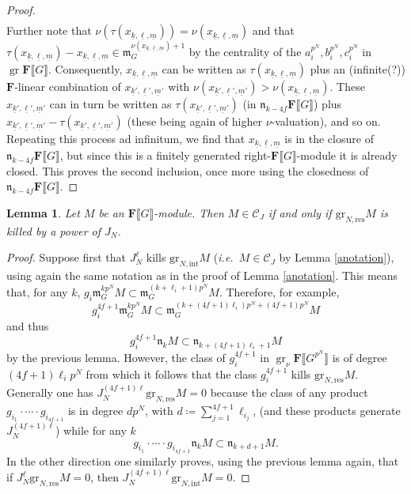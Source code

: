 \documentclass[11pt, oneside]{article}
\newcommand{\gres}{\text{gr}_{N,\text{res}}}
\newcommand{\grint}{\text{gr}_{N,\text{int}}}
\DeclareMathOperator{\gr}{gr}
\newtheorem{lemma}{Lemma}
\theoremstyle{definition}
\begin{document}
\begin{proof}
\begin{align*}
		\end{align*} Further note that $\nu(\tau(x_{\underline k,\underline\ell,\underline m}))=\nu(x_{\underline k,\underline\ell,\underline m})$ and that $\tau(x_{\underline k,\underline\ell,\underline m})-x_{\underline k,\underline\ell,\underline m}\in\mathfrak m_G^{\nu(x_{\underline k,\underline\ell,\underline m})+1}$ by the centrality of the $a_i^{p^N},b_i^{p^N},c_i^{p^N}$ in $\gr\mathbf F\llbracket G\rrbracket$. Consequently, $x_{\underline k,\underline\ell,\underline m}$ can be written as $\tau(x_{\underline k,\underline\ell,\underline m})$ plus an (infinite(?)) $\mathbf F$-linear combination of $x_{\underline k',\underline\ell',\underline m'}$ with $\nu(x_{\underline k',\underline\ell',\underline m'})>\nu(x_{\underline k,\underline\ell,\underline m})$. These $x_{\underline k',\underline\ell',\underline m'}$ can in turn be written as $\tau(x_{\underline k',\underline\ell',\underline m'})$ (in $\mathfrak n_{k-4f}\mathbf F\llbracket G\rrbracket$) plus $x_{\underline k',\underline\ell',\underline m'}-\tau(x_{\underline k',\underline\ell',\underline m'})$ (these being again of higher $\nu$-valuation), and so on.\\
		Repeating this process ad infinitum, we find that $x_{\underline k,\underline\ell,\underline m}$ is in the closure of $\mathfrak n_{k-4f}\mathbf F\llbracket G\rrbracket$, but since this is a finitely generated right-$\mathbf F\llbracket G\rrbracket$-module it is already closed. This proves the second inclusion, once more using the closedness of $\mathfrak n_{k-4f}\mathbf F\llbracket G\rrbracket$.
	\end{proof}
	\begin{lemma}\label{lastlemma}
		Let $M$ be an $\mathbf F\llbracket G\rrbracket$-module. Then $M\in\mathcal C_J$ if and only if $\gres M$ is killed by a power of $J_N$.
	\end{lemma}
	\begin{proof}
		Suppose first that $J_N^\ell$ kills $\grint M$ (\emph{i.e.~}$M\in\mathcal C_J$ by Lemma \ref{anotation}), using again the same notation as in the proof of Lemma \ref{anotation}. This means that, for any $k$, $g_i\mathfrak m_G^{kp^N}M\subset\mathfrak m_G^{(k+\ell_i+1)p^N}M$. Therefore, for example, $$g_i^{4f+1}\mathfrak m_G^{kp^N}M\subset\mathfrak m_G^{(k+(4f+1)\ell_i)p^N+(4f+1)p^N}M$$ and thus $$g_i^{4f+1}\mathfrak n_kM\subset\mathfrak n_{k+(4f+1)\ell_i+1}M$$ by the previous lemma.
		However, the class of $g_i^{4f+1}$ in $\gr_\nu\mathbf F\llbracket G^{p^N}\rrbracket$ is of degree $(4f+1)\ell_ip^N$ from which it follows that the class $g_i^{4f+1}$ kills $\gres M$. Generally one has $J_N^{(4f+1)\ell}\gres M=0$ because the class of any product $g_{i_1}\cdot\cdots\cdot g_{i_{4f+1}}$ is in degree $dp^N$, with $d\coloneqq\sum_{j=1}^{4f+1}\ell_{i_j}$, (and these products generate $J_N^{(4f+1)\ell}$) while for any $k$ $$g_{i_1}\cdot\cdots\cdot g_{i_{4f+1}}\mathfrak n_kM\subset\mathfrak n_{k+d+1}M.$$
		In the other direction one similarly proves, using the previous lemma again, that if $J_N^\ell\gres M=0$, then $J_N^{(4f+1)\ell}\grint M=0$.
	\end{proof}
\end{document}
